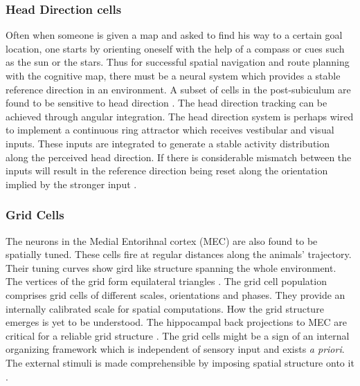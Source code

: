 \subsubsection{Head Direction cells}
Often when someone is given a map and asked to find his way to a certain goal location, one starts by orienting oneself with the help of a compass or cues such as the sun or the stars. Thus for successful spatial navigation and route planning with the cognitive map, there must be a neural system which provides a stable reference direction in an environment. A subset of cells in the post-subiculum  are found to be sensitive to head direction \cite{Taube1990}. The head direction tracking can be achieved through angular integration. The head direction system is perhaps wired to implement a continuous ring attractor which receives vestibular and visual inputs. These inputs are integrated to generate a stable activity distribution along the perceived head direction. If there is considerable mismatch between the inputs will result in the reference direction being reset along the orientation implied by the stronger input \cite{Valerio2012}.

\subsubsection{Grid Cells}
The neurons in the Medial Entorihnal cortex (MEC) are also found to be spatially tuned. These cells fire at regular distances along the animals' trajectory. Their tuning curves show gird like structure spanning the whole environment. The vertices of the grid form equilateral triangles \cite{Hafting2005}. The grid cell population comprises grid cells of different scales, orientations and phases. They provide an internally  calibrated scale for spatial computations. How the grid structure emerges is yet to be understood. The hippocampal back projections to MEC are critical for a reliable grid structure \cite{Bonnevie2013}. The grid cells might be a sign of an internal organizing framework which is independent of sensory input and exists \emph{a priori}. The external stimuli is made comprehensible by imposing spatial structure onto it \cite{Kant2003}. 

